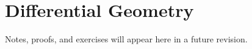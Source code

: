 \section{Differential Geometry}

\begin{remark*}[Status]
Notes, proofs, and exercises will appear here in a future revision.
\end{remark*}